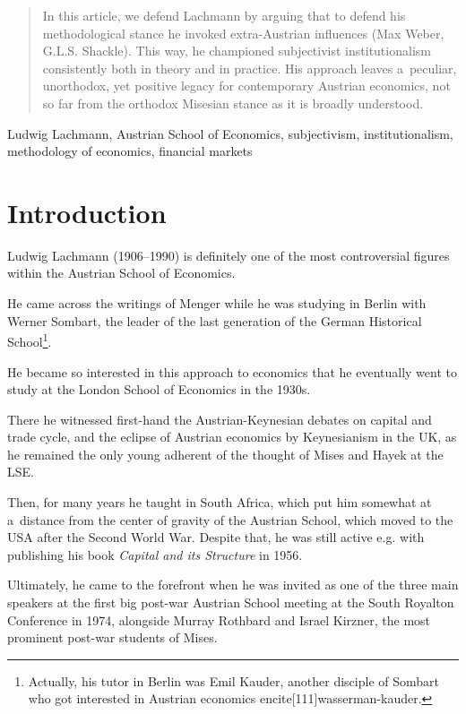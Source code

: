 {\begin{abstract}
In this article, we defend Lachmann by arguing that to defend his methodological stance he invoked extra-Austrian influences (Max Weber, G.L.S. Shackle). This way, he championed subjectivist institutionalism consistently both in theory and in practice. His approach leaves a~peculiar, unorthodox, yet positive legacy for contemporary Austrian economics, not so far from the orthodox Misesian stance as it is broadly understood.

\end{abstract}



\engkeywords Ludwig Lachmann, Austrian School of Economics, subjectivism, institutionalism, methodology of economics, financial markets



\section{Introduction}



Ludwig Lachmann (1906--1990) is definitely one of the most controversial figures within the Austrian School of Economics.

He came across the writings of Menger while he was studying in Berlin with Werner Sombart, the leader of the last generation of the German Historical School\footnote{Actually, his tutor in Berlin was Emil Kauder, another disciple of Sombart who got interested in Austrian economics encite[111]{wasserman-kauder}.}.

He became so interested in this approach to economics that he eventually went to study at the London School of Economics in the 1930s.

There he witnessed first-hand the Austrian-Keynesian debates on capital and trade cycle, and the eclipse of Austrian economics by Keynesianism in the UK, as he remained the only young adherent of the thought of Mises and Hayek at the LSE.

Then, for many years he taught in South Africa, which put him somewhat at a~distance from the center of gravity of the Austrian School, which moved to the USA after the Second World War. Despite that, he was still active e.g. with publishing his book \emph{Capital and its Structure} in 1956.

Ultimately, he came to the forefront when he was invited as one of the three main speakers at the first big post-war Austrian School meeting at the South Royalton Conference in 1974, alongside Murray Rothbard and Israel Kirzner, the most prominent post-war students of Mises.

}
